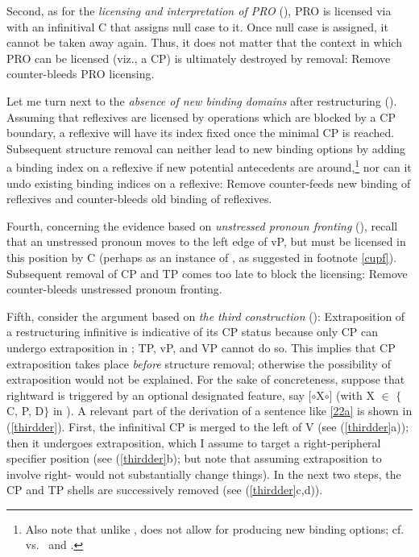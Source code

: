 \documentclass[output=paper]{langsci/langscibook}
\begin{document}
Second, as for the {\it licensing and interpretation of PRO} (), PRO
is licensed via  with an infinitival C that assigns null case to it. Once
null case is assigned, it cannot be taken away again. Thus, it does not matter
that the context in which PRO can be licensed (viz., a CP) is ultimately
destroyed by removal: Remove counter-bleeds PRO licensing.

Let me turn next to the {\it absence of new binding domains} after
restructuring ().  Assuming that reflexives are licensed by 
operations which are blocked by a CP boundary, a reflexive will have its index
fixed once the minimal CP is reached. Subsequent structure removal can neither
lead to new binding options by adding a binding index on a reflexive if new
potential antecedents are around,\footnote{Also note that unlike ,
     does not allow for  producing new binding options; cf.
\cite{Barss:86} vs.\ \cite{Frey:93} and \cite{Buering:05}.} nor can it undo
existing binding indices on a reflexive: Remove counter-feeds new binding of
reflexives and counter-bleeds old binding of reflexives.

Fourth, concerning the evidence based on {\it unstressed pronoun
fronting}
(), recall that  an unstressed pronoun moves to the left edge of vP,
but must be licensed in this position by C (perhaps as an instance of , as
suggested in footnote \ref{cupf}). Subsequent removal of CP and TP comes too
late to block the licensing: Remove counter-bleeds unstressed pronoun fronting.

Fifth, consider the argument based on {\it the third construction} ():
Extraposition of a restructuring infinitive is indicative of its CP status
because only CP can undergo extraposition in ; TP, vP, and VP cannot do
so. This implies that CP extraposition takes place {\it before} structure
removal; otherwise the possibility of extraposition would not be explained. For
the sake of concreteness, suppose that rightward  is triggered by an
optional designated feature, say [$\circ$X$\circ$] (with X $\in$ $\{$C, P,
D$\}$ in ). A relevant part of the derivation of a sentence like
\eqref{22a} is shown in (\ref{thirdder}). First, the infinitival CP is merged
to the left of V (see (\ref{thirdder}a)); then it undergoes extraposition,
which I assume to target a right-peripheral specifier position (see
(\ref{thirdder}b); but note that assuming extraposition to involve
right- would not substantially change things). In the next two steps,
the CP and TP shells are successively removed (see
(\ref{thirdder}c,d)).\newpage
\end{document}
